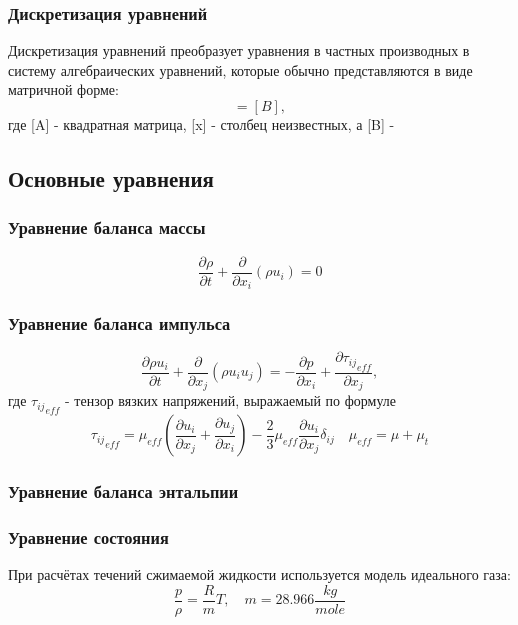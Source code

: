 \documentclass[pdftex,a4paper,12pt]{article}
\begin{document}
		\subsubsection{Дискретизация уравнений}
			Дискретизация уравнений преобразует уравнения в частных производных в систему алгебраических уравнений, которые обычно представляются в виде матричной форме:
			\begin{equation}
				[A][x] = [B],
			\end{equation}
			где [A] - квадратная матрица, [x] - столбец неизвестных, а [B] - 
	\newpage
	\subsection{Основные уравнения}
		\subsubsection{Уравнение баланса массы}
			\begin{equation}
				\frac{\partial \rho}{\partial t} + \frac{\partial}{\partial x_i}(\rho u_i) = 0
			\end{equation}
		\subsubsection{Уравнение баланса импульса}
			\begin{equation}
				\frac{\partial \rho u_i}{\partial t} + \frac{\partial}{\partial x_j}(\rho u_iu_j) = - \frac{\partial p}{\partial x_i} + \frac{\partial {\tau_{ij}}_{eff}}{\partial x_j},
			\end{equation}
			где ${\tau_{ij}}_{eff}$ - тензор вязких напряжений, выражаемый по формуле
			\begin{equation}
				{\tau_{ij}}_{eff} = \mu_{eff}\left( \frac{\partial u_i}{\partial x_j} + \frac{\partial u_j}{\partial x_i} \right) - \frac{2}{3}\mu_{eff}\frac{\partial u_i}{\partial x_j} \delta_{ij} \quad \mu_{eff} = \mu + \mu_{t}
			\end{equation}
		\subsubsection{Уравнение баланса энтальпии}
		\subsubsection{Уравнение состояния}
			\hspace{2em}При расчётах течений сжимаемой жидкости используется модель идеального газа:
			\begin{equation}
				\frac{p}{\rho} = \frac{R}{m}T, \quad m = 28.966 \frac{kg}{mole}
			\end{equation}
\end{document}
